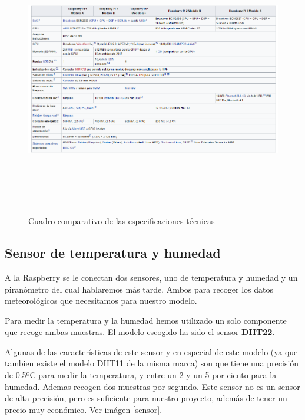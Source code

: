 \begin{figure}[htb]
	\begin{center}
		\includegraphics[width=17cm,height=12cm]{figures/Cuadro_Tipos_Raspberry.png}
		\caption{Cuadro comparativo de las especificaciones técnicas}
	\end{center}

	\label{types}
\end{figure}

\subsection*{Sensor de temperatura y humedad}

A la Raspberry se le conectan dos sensores, uno de temperatura y humedad y un piranómetro del cual hablaremos más tarde. Ambos para recoger los datos meteorológicos que necesitamos para nuestro modelo.

Para medir la temperatura y la humedad hemos utilizado un solo componente que recoge ambas muestras. El modelo escogido ha sido el sensor \textbf{DHT22}.

Algunas de las características de este sensor y en especial de este modelo (ya que tambien existe el modelo DHT11 de la misma marca) son que tiene una precisión de 0.5ºC para medir la temperatura, y entre un 2 y un 5 por ciento para la humedad. Ademas recogen dos muestras por segundo. Este sensor no es un sensor de alta precisión, pero es suficiente para nuestro proyecto, además de tener un precio muy económico. Ver imágen \ref{sensor}.

